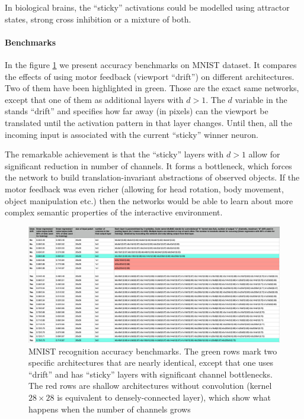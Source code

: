 \documentclass[12pt]{article}
\begin{document}
In biological brains,  the ``sticky'' activations could be modelled using attractor states, strong cross inhibition or a mixture of both.
 

\paragraph{Benchmarks} In the figure \ref{fig:benchmarks} we present accuracy benchmarks on MNIST dataset. It compares the effects of using  motor feedback (viewport ``drift'') on different architectures. Two of them have been highlighted in green. Those are the exact same networks, except that one of them as additional layers with $d>1$. The $d$ variable in the stands ``drift'' and specifies how far away (in pixels) can the viewport be translated until the activation pattern in that layer changes. Until then, all the incoming input is associated with the current ``sticky'' winner neuron. 

The remarkable achievement is that the ``sticky'' layers with $d>1$ allow for significant reduction in number of channels. It forms a bottleneck, which forces the network to build translation-invariant abstractions of observed objects. If the motor feedback was even richer (allowing for head rotation, body movement, object manipulation etc.) then the networks would be able to learn about more complex semantic properties of the interactive environment.

\begin{figure}[!htbp]
	\centering
	\includegraphics[width=13.8cm]{benchmarks}
	\caption{MNIST recognition accuracy benchmarks. The green rows mark two specific architectures that are nearly identical, except that one uses ``drift'' and has ``sticky'' layers with significant channel bottlenecks.  The red rows are shallow architectures without convolution (kernel $28\times28$ is equivalent to densely-connected layer), which show what happens when the number of channels grows}
	\label{fig:benchmarks}
\end{figure} 
\end{document}
